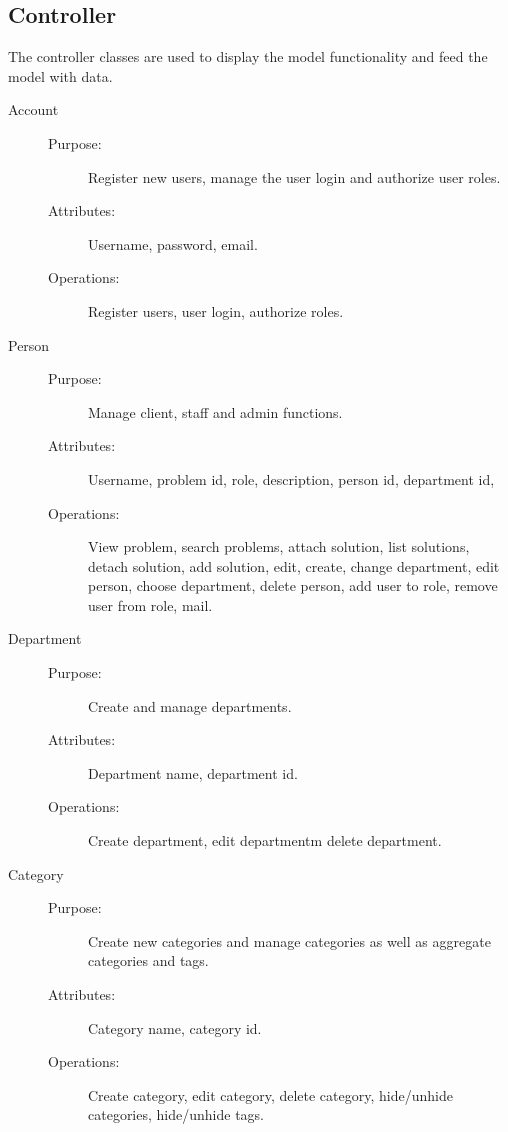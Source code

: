\subsection{Controller}

The controller classes are used to display the model functionality and feed the model with data.

\begin{description}
\item[Account]\hfill
\begin{description}
\item[Purpose:]Register new users, manage the user login and authorize user roles.
\item[Attributes:]Username, password, email.
\item[Operations:]Register users, user login, authorize roles.
\end{description}
\end{description}

\begin{description}
\item[Person]\hfill
\begin{description}
\item[Purpose:]Manage client, staff and admin functions.
\item[Attributes:]Username, problem id, role, description, person id, department id, 
\item[Operations:]View problem, search problems, attach solution, list solutions, detach solution, add solution, edit, create, change department, edit person, choose department, delete person, add user to role, remove user from role, mail.
\end{description}
\end{description}

\begin{description}
\item[Department]\hfill
\begin{description}
\item[Purpose:]Create and manage departments.
\item[Attributes:]Department name, department id.
\item[Operations:]Create department, edit departmentm delete department.
\end{description}
\end{description}

\begin{description}
\item[Category]\hfill
\begin{description}
\item[Purpose:]Create new categories and manage categories as well as aggregate categories and tags.
\item[Attributes:]Category name, category id.
\item[Operations:]Create category, edit category, delete category, hide/unhide categories, hide/unhide tags.
\end{description}
\end{description}

